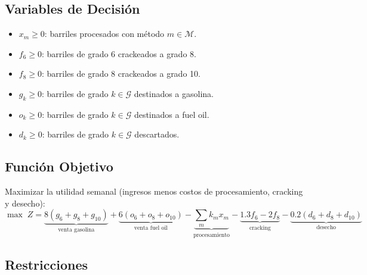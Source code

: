 \documentclass[12pt,a4paper]{article}
\begin{document}
\subsection{Variables de Decisión}

\begin{varbox}
\begin{itemize}[leftmargin=1.5em]
  \item $x_m \geq 0$: barriles procesados con método $m \in \mathcal{M}$.
  \item $f_6 \geq 0$: barriles de grado 6 crackeados a grado 8.
  \item $f_8 \geq 0$: barriles de grado 8 crackeados a grado 10.
  \item $g_k \geq 0$: barriles de grado $k \in \mathcal{G}$ destinados a gasolina.
  \item $o_k \geq 0$: barriles de grado $k \in \mathcal{G}$ destinados a fuel oil.
  \item $d_k \geq 0$: barriles de grado $k \in \mathcal{G}$ descartados.
\end{itemize}
\end{varbox}

\subsection{Función Objetivo}

\begin{fobox}
Maximizar la utilidad semanal (ingresos menos costos de procesamiento, cracking y desecho):
\[
  \max\; Z = \underbrace{8(g_6+g_8+g_{10})}_{\text{venta gasolina}}
           + \underbrace{6(o_6+o_8+o_{10})}_{\text{venta fuel oil}}
           - \underbrace{\sum_m k_m x_m}_{\text{procesamiento}}
           - \underbrace{1.3f_6 - 2f_8}_{\text{cracking}}
           - \underbrace{0.2(d_6+d_8+d_{10})}_{\text{desecho}}
\]
\end{fobox}

\subsection{Restricciones}
\end{document}
